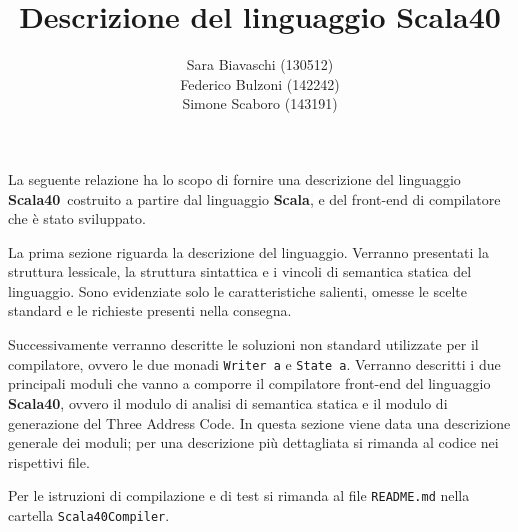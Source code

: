 \documentclass{article}
\title{Descrizione del linguaggio Scala40}
\date{}
\author{Sara Biavaschi (130512)\\
Federico Bulzoni (142242)\\
Simone Scaboro (143191)}
\newcommand{\SBF}{\textbf{Scala40}}
\begin{document}
    \maketitle

La seguente relazione ha lo scopo di fornire una descrizione del linguaggio \SBF\, costruito a partire dal linguaggio {\bf Scala}, e del front-end di compilatore che è stato sviluppato.

La prima sezione riguarda la descrizione del linguaggio. Verranno presentati la struttura lessicale, la struttura sintattica e i vincoli di semantica statica del linguaggio. Sono evidenziate solo le caratteristiche salienti, omesse le scelte standard e le richieste presenti nella consegna.

Successivamente verranno descritte le soluzioni non standard utilizzate per il compilatore, ovvero le due monadi {\tt Writer a} e {\tt State a}. Verranno descritti i due principali moduli che vanno a comporre il compilatore front-end del linguaggio \SBF, ovvero il modulo di analisi di semantica statica e il modulo di generazione del Three Address Code. In questa sezione viene data una descrizione generale dei moduli; per una descrizione più dettagliata si rimanda al codice nei rispettivi file. 

Per le istruzioni di compilazione e di test si rimanda al file \texttt{README.md} nella cartella \texttt{Scala40Compiler}.

  


\end{document}
